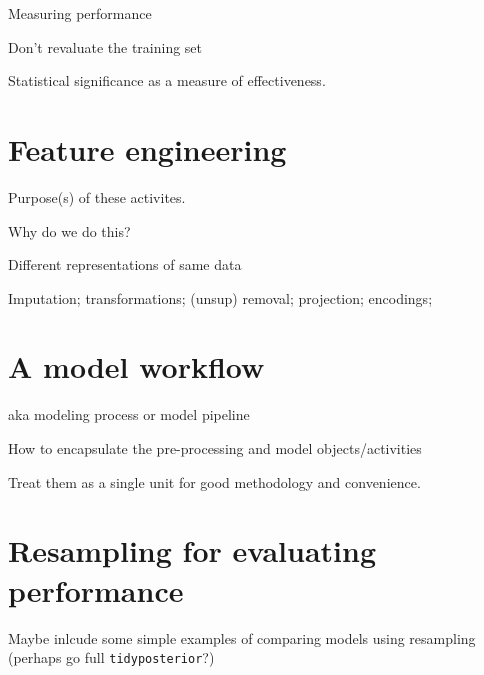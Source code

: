 \documentclass[11pt]{book}
\begin{document}
Measuring performance

Don't revaluate the training set

Statistical significance as a measure of effectiveness.

\hypertarget{feature-engineering}{%
\chapter{Feature engineering}\label{feature-engineering}}

Purpose(s) of these activites.

Why do we do this?

Different representations of same data

Imputation; transformations; (unsup) removal; projection; encodings;

\hypertarget{workflows}{%
\chapter{A model workflow}\label{workflows}}

aka modeling process or model pipeline

How to encapsulate the pre-processing and model objects/activities

Treat them as a single unit for good methodology and convenience.

\hypertarget{resampling}{%
\chapter{Resampling for evaluating performance}\label{resampling}}

Maybe inlcude some simple examples of comparing models using resampling (perhaps go full \texttt{tidyposterior}?)


\end{document}
